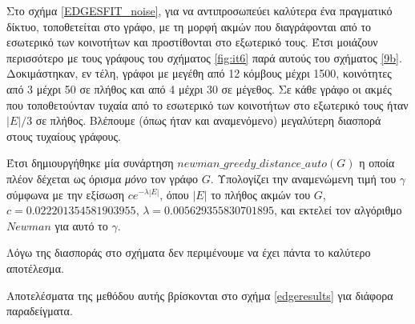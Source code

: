 \documentclass[12pt, letterpaper]{article}
\begin{document}
Στο σχήμα \ref{EDGESFIT_noise}, για να αντιπροσωπεύει καλύτερα ένα πραγματικό δίκτυο,
τοποθετείται  στο γράφο, με τη μορφή ακμών που διαγράφονται από το 
εσωτερικό των κοινοτήτων και προστίθονται στο εξωτερικό τους. Έτσι μοιάζουν περισσότερο
με τους γράφους του σχήματος \ref{fig:it6} παρά αυτούς του σχήματος \ref{9b}. 
Δοκιμάστηκαν, εν τέλη, γράφοι με μεγέθη από 12 κόμβους μέχρι 1500, κοινότητες
από 3 μέχρι 50 σε πλήθος και από 4 μέχρι 30 σε μέγεθος. Σε κάθε γράφο 
οι ακμές που τοποθετούνταν τυχαία από το εσωτερικό των κοινοτήτων στο εξωτερικό τους 
ήταν $|E|/3$ σε πλήθος. Βλέπουμε (όπως ήταν και αναμενόμενο) μεγαλύτερη διασπορά 
στους τυχαίους γράφους. 



Έτσι δημιουργήθηκε μία συνάρτηση $newman\_greedy\_distance\_auto(G)$ η οποία πλέον
δέχεται ως όρισμα \emph{μόνο} τον γράφο $G$. Υπολογίζει την αναμενώμενη τιμή του $\gamma$
σύμφωνα με την εξίσωση $ce^{-\lambda |E|}$, όπου $|E|$ το πλήθος ακμών του $G$, 
$c=0.022201354581903955$, $\lambda = 0.005629355830701895$, και εκτελεί τον αλγόριθμο $Newman$ για αυτό το $\gamma$. 

Λόγω της διασποράς στο σχήματα δεν περιμένουμε να έχει πάντα το καλύτερο
αποτέλεσμα.

Αποτελέσματα της μεθόδου αυτής βρίσκονται στο σχήμα \ref{edgeresults} για διάφορα παραδείγματα. 
\end{document}
